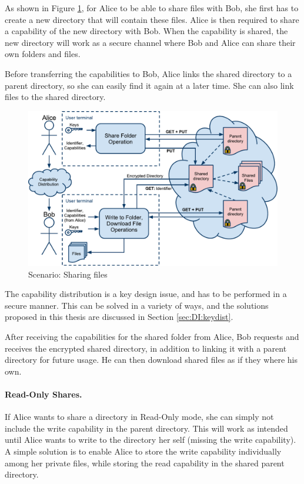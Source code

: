 \documentclass[pdftex,english,10pt,b5paper,twoside]{book}
\begin{document}
As shown in Figure \ref{fig:AS:sharing}, for Alice to be able to share files
with Bob, she first has to create a new directory that will contain these
files. Alice is then required to share a capability of the new directory with
Bob. When the capability is shared, the new directory will work as a secure
channel where Bob and Alice can share their own folders and files.

Before transferring the capabilities to Bob, Alice links the shared directory to
a parent directory, so she can easily find it again at a later time. She can
also link files to the shared directory.

\begin{figure}[h!]
    \centering
    \includegraphics[width=\columnwidth]{ArchitectureShare.pdf}
    \caption{Scenario: Sharing files}
    \label{fig:AS:sharing}
\end{figure}

The capability distribution is a key design issue, and has to be performed in a
secure manner. This can be solved in a variety of ways, and the solutions
proposed in this thesis are discussed in Section \ref{sec:DI:keydist}.

After receiving the capabilities for the shared folder from Alice, Bob requests
and receives the encrypted shared directory, in addition to linking it with a
parent directory for future usage. He can then download shared files as if they
where his own.

\paragraph{Read-Only Shares.}

If Alice wants to share a directory in Read-Only mode, she can simply
not include the write capability in the parent directory. This will work as
intended until Alice wants to write to the directory her self (missing the write
capability). A simple solution is to enable Alice to store the write capability
individually among her private files, while storing the read capability in the
shared parent directory.
\end{document}
